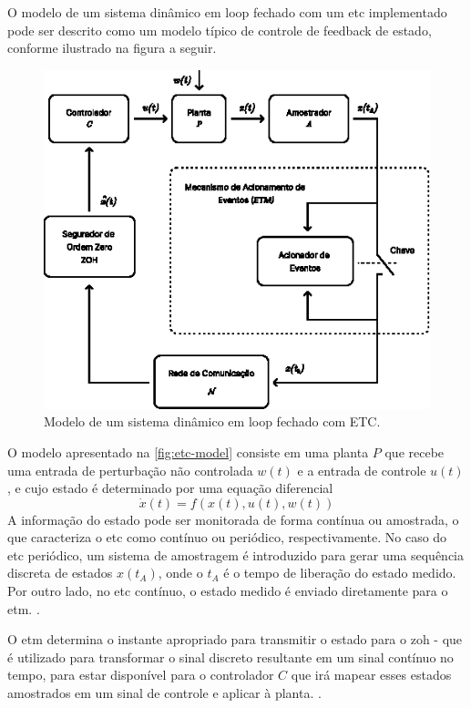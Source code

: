 O modelo de um sistema dinâmico em loop fechado com um \acrshort{etc} implementado pode ser descrito como um modelo típico de controle de feedback de estado, conforme ilustrado na figura a seguir.

\begin{figure}[H]
  \centering
  \includegraphics[scale=2.]{figuras/etc-model.eps}
  \caption{Modelo de um sistema dinâmico em loop fechado com ETC.}
  \label{fig:etc-model}
\end{figure}

O modelo apresentado na \autoref{fig:etc-model} consiste em uma planta $ P$ que recebe uma entrada de perturbação não controlada $w(t)$ e a entrada de controle $u(t)$, e cujo estado é determinado por uma equação diferencial \begin{equation}\dot{x}(t) = f(x(t), u(t), w(t))\end{equation} A informação do estado pode ser monitorada de forma contínua ou amostrada, o que caracteriza o \acrshort{etc} como contínuo ou periódico, respectivamente. No caso do \acrshort{etc} periódico, um sistema de amostragem é introduzido para gerar uma sequência discreta de estados $x(t_A)$, onde o $t_A$ é o tempo de liberação do estado medido. Por outro lado, no \acrshort{etc} contínuo, o estado medido é enviado diretamente para o \acrshort{etm}. \cite{peng2018,coutinho2021,Lemmon2010}.

O \acrshort{etm} determina o instante apropriado para transmitir o estado para o \acrfull{zoh} - que é utilizado para transformar o sinal discreto resultante em um sinal contínuo no tempo,  para estar disponível para o controlador $C$ que irá mapear esses estados amostrados em um sinal de controle e aplicar à planta. \cite{coutinho2021}.

